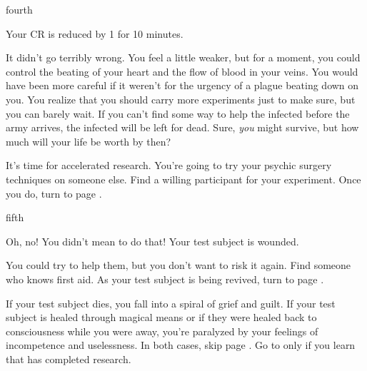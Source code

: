 \documentclass[greennotebook]{Pestilence} %
\begin{document}
\begin{page}{fourth}

Your CR is reduced by 1 for 10 minutes.

It didn't go terribly wrong. You feel a little weaker, but for a moment, you could control the beating of your heart and the flow of blood in your veins. You would have been more careful if it weren't for the urgency of a plague beating down on you. You realize that you should carry more experiments just to make sure, but you can barely wait. If you can't find some way to help the infected before the army arrives, the infected will be left for dead. Sure, \textit{you} might survive, but how much will your life be worth by then?

It's time for accelerated research. You're going to try your psychic surgery techniques on someone else. Find a willing participant for your experiment. Once you do, turn to page .

\end{page}

\begin{page}{fifth}

Oh, no! You didn't mean to do that! Your test subject is wounded.

You could try to help them, but you don't want to risk it again. Find someone who knows first aid. As your test subject is being revived, turn to page .

If your test subject dies, you fall into a spiral of grief and guilt. If your test subject is healed through magical means or if they were healed back to consciousness while you were away, you're paralyzed by your feelings of incompetence and uselessness. In both cases, skip page . Go to  only if you learn that \cOutsider{} has completed \cOutsider{\their} research.

\end{page}
\end{document}
